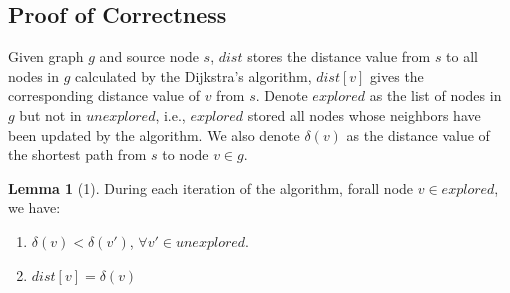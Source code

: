 \documentclass[11pt, oneside]{article}   	%
\theoremstyle{definition}
\newtheorem*{lemma}{Lemma}
\begin{document}
\subsection{Proof of Correctness}
Given graph $g$ and source node $s$, $dist$ stores the distance value from $s$ to all nodes in $g$ calculated by the Dijkstra's algorithm, $dist[v]$ gives the corresponding distance value of $v$ from $s$. Denote $explored$ as the list of nodes in $g$ but not in $unexplored$, i.e., $explored$ stored all nodes whose neighbors have been updated by the algorithm. We also denote $\delta(v)$ as the distance value of the shortest path from $s$ to node $v \in g$. 
\newpage
\begin{lemma}
[1] During each iteration of the algorithm, forall node $v \in explored$, we have:
\begin{enumerate}
  \item $\delta(v) < \delta(v')$, $\forall v' \in unexplored$.
  \item $dist[v] = \delta(v)$
\end{enumerate}
\end{lemma}
\end{document}
